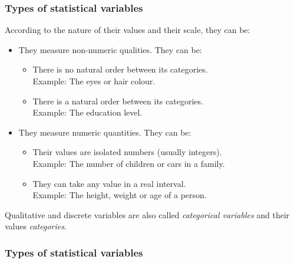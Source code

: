 \begin{frame}
\frametitle{Types of statistical variables}
According to the nature of their values and their scale, they can be:
\begin{itemize}
\item {} They measure non-numeric qualities. 
They can be:
\begin{itemize}
\item {} There is no natural order between its categories.\\
Example: The eyes or hair colour. 
\item {} There is a natural order between its categories. \\
Example: The education level.
\end{itemize}
\item {} They measure numeric quantities. 
They can be:
\begin{itemize}
\item {} Their values are isolated numbers (usually integers).\\
Example: The number of children or cars in a family.
\item {} They can take any value in a real interval.\\
Example: The height, weight or age of a person. 
\end{itemize}
\end{itemize}
Qualitative and discrete variables are also called \emph{categorical variables} and their values \emph{categories}.
\end{frame}


\begin{frame}
\frametitle{Types of statistical variables}
\begin{center}
\resizebox{\textwidth}{!}{}
\end{center}
\end{frame}




